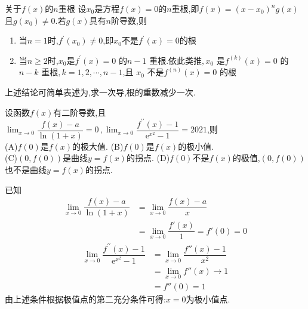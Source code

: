 \documentclass[8pt a4paper, oneside, UTF8]{ctexbook}  %
\begin{document}
\begin{sloppypar}
    \begin{conclusion}{关于$f(x)$的$n$重根}{}
        设$x_0$是方程$f(x)=0$的$n$重根,即$f(x)=(x-x_0)^ng(x)$且$g(x_0)\neq0.$若$g(x)$具有$n$阶导数,则
        \begin{enumerate}
            \item 当$n=1$时,$f^\prime(x_0)\neq0$,即$x_0$不是$f^\prime(x)=0$的根
            \item 当$n\geqslant2$时,$x_0$是$f^\prime(x)=0$ 的$n-1$ 重根.依此类推$,x_0$ 是$f^{(k)}(x)=0$ 的$n-k$ 重根$,k=1,2,\cdots,n-1$,且 $x_0$ 不是$f^{(n)}(x)=0$ 的根
        \end{enumerate}
        上述结论可简单表述为,求一次导,根的重数减少一次.
    \end{conclusion}
    \begin{problem}
    设函数$f(x)$有二阶导数,且$\operatorname*{lim}_{x\to0}\dfrac{f(x)-a}{\operatorname{ln}(1+x)}=0\,,\operatorname*{lim}_{x\to0}\dfrac{f^{\prime\prime}(x)-1}{\mathrm{e}^{x^{2}}-1}=2021$,则\\
    (A)$f(0)$是$f(x)$的极大值.\quad
    (B)$f(0)$是$f(x)$的极小值.\\
    (C)$(0,f(0))$是曲线$y=f(x)$的拐点.\quad
    (D)$f(0)$不是$f(x)$的极值,$(0,f(0))$也不是曲线$y=f(x)$的拐点.
    \end{problem}
    \begin{solution}
        已知
        \begin{align*}
            \operatorname*{lim}_{x\to0}\dfrac{f(x)-a}{\operatorname{ln}(1+x)} & = \lim_{x\to 0}\dfrac{f(x)-a}{x}        \\
                                                                              & = \lim_{x\to 0}\dfrac{f'(x)}{1}=f'(0)=0
        \end{align*}
        \begin{align*}
            \operatorname*{lim}_{x\to0}\dfrac{f^{\prime\prime}(x)-1}{\mathrm{e}^{x^{2}}-1} & =  \lim_{x\to 0}\dfrac{f''(x)-1}{x^2} \\
                                                                                           & = \lim_{x\to 0} f''(x) \to 1          \\
                                                                                           & =f''(0)=1
        \end{align*}
        由上述条件根据极值点的第二充分条件可得:$x=0$为极小值点.
    \end{solution}

\end{sloppypar}
\end{document}
